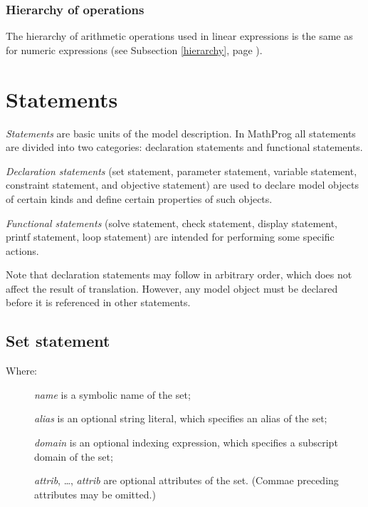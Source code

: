 \documentclass[10pt]{article}
\begin{document}
\subsubsection{Hierarchy of operations}

The hierarchy of arithmetic operations used in linear expressions is
the same as for numeric expressions (see Subsection \ref{hierarchy},
page \pageref{hierarchy}).


\newpage

\section{Statements}

{\it Statements} are basic units of the model description. In MathProg
all statements are divided into two categories: declaration statements
and functional statements.

{\it Declaration statements} (set statement, parameter statement,
variable statement, constraint statement, and objective statement) are
used to declare model objects of certain kinds and define certain
properties of such objects.

{\it Functional statements} (solve statement, check statement, display
statement, printf statement, loop statement) are intended for
performing some specific actions.

Note that declaration statements may follow in arbitrary order, which
does not affect the result of translation. However, any model object
must be declared before it is referenced in other statements.

\subsection{Set statement}

\medskip


\setlength{\leftmargini}{60pt}

\begin{description}
\item[{\rm Where:}\hspace*{23pt}] {\it name} is a symbolic name of the
set;
\item[\hspace*{54pt}] {\it alias} is an optional string literal, which
specifies an alias of the set;
\item[\hspace*{54pt}] {\it domain} is an optional indexing expression,
which specifies a subscript domain of the set;
\item[\hspace*{54pt}] {\it attrib}, \dots, {\it attrib} are optional
attributes of the set. (Commae preceding attributes may be omitted.)
\end{description}
\end{document}
